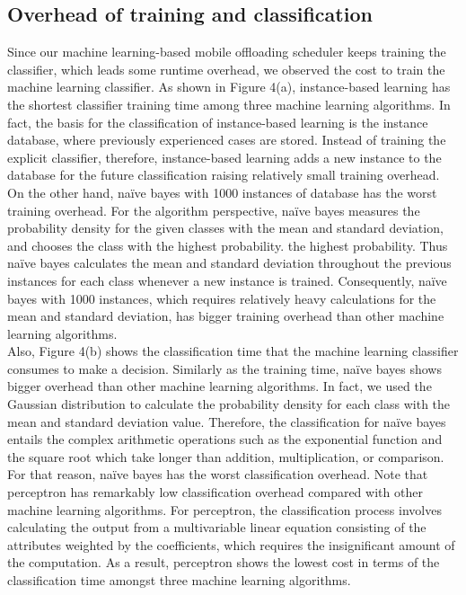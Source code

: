 \documentclass[10pt, conference, compsocconf]{IEEEtran}
\begin{document}
{\subsection{Overhead of training and classification}
%
Since our machine learning-based mobile offloading scheduler keeps
training the classifier, which leads some runtime overhead, we
observed the cost to train the machine learning classifier.
%
As shown in Figure 4(a), instance-based learning has the shortest
classifier training time among three machine learning algorithms.  
%
In fact, the basis for the classification of instance-based learning is
the instance database, where previously experienced cases are stored.
%
Instead of training the explicit classifier, therefore, instance-based
learning adds a new instance to the database for the future
classification raising relatively small training overhead.
%
On the other hand, na\"{i}ve bayes with 1000 instances of database has
the worst training overhead. 
%
For the algorithm perspective, na\"{i}ve bayes measures the
probability density for the given classes with the mean and standard
deviation, and chooses the class with the highest probability.
the highest probability.
%
Thus na\"{i}ve bayes calculates the mean and standard deviation
throughout the previous instances for each class whenever a new instance
is trained.
%
Consequently, na\"{i}ve bayes with 1000 instances, which requires
relatively heavy calculations for the mean and standard deviation, has
bigger training overhead than other machine learning algorithms.\\
%
\indent Also, Figure 4(b) shows the classification time that the machine
learning classifier consumes to make a decision.
%
Similarly as the training time, na\"{i}ve bayes shows bigger overhead
than other machine learning algorithms.
%
In fact, we used the Gaussian distribution to calculate the probability
density for each class with the mean and standard deviation value.
%
Therefore, the classification for na\"{i}ve bayes entails the complex
arithmetic operations such as the exponential function and the square root
which take longer than addition, multiplication, or comparison.
%
For that reason, na\"{i}ve bayes has the worst classification overhead.
%
Note that perceptron has remarkably low classification overhead compared
with other machine learning algorithms. 
%
For perceptron, the classification process involves calculating the
output from a multivariable linear equation consisting of the attributes
weighted by the coefficients, which requires the insignificant amount of
the computation. 
%
As a result, perceptron shows the lowest cost in terms of the
classification time amongst three machine learning algorithms.
%
}
\end{document}
